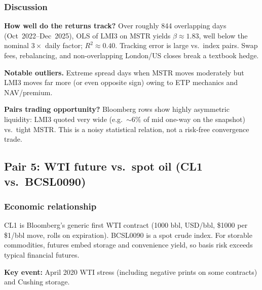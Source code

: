 
\subsubsection*{Discussion}

\textbf{How well do the returns track?}
Over roughly 844 overlapping days (Oct~2022--Dec~2025), OLS of LMI3 on MSTR yields $\beta \approx 1.83$, well below the nominal $3\times$ daily factor; $R^2 \approx 0.40$. Tracking error is large vs.\ index pairs. Swap fees, rebalancing, and non-overlapping London/US closes break a textbook hedge.

\textbf{Notable outliers.}
Extreme spread days when MSTR moves moderately but LMI3 moves far more (or even opposite sign) owing to ETP mechanics and NAV/premium.

\textbf{Pairs trading opportunity?}
Bloomberg rows show highly asymmetric liquidity: LMI3 quoted very wide (e.g.\ $\sim 6\%$ of mid one-way on the snapshot) vs.\ tight MSTR. This is a noisy statistical relation, not a risk-free convergence trade.

\subsection{Pair 5: WTI future vs.\ spot oil (CL1 vs.\ BCSL0090)}
\label{subsec:pair5}

\subsubsection*{Economic relationship}
CL1 is Bloomberg's generic first WTI contract (1000 bbl, USD/bbl, \$1000 per \$1/bbl move, rolls on expiration). BCSL0090 is a spot crude index. For storable commodities, futures embed storage and convenience yield, so basis risk exceeds typical financial futures.

\textbf{Key event:} April 2020 WTI stress (including negative prints on some contracts) and Cushing storage.


